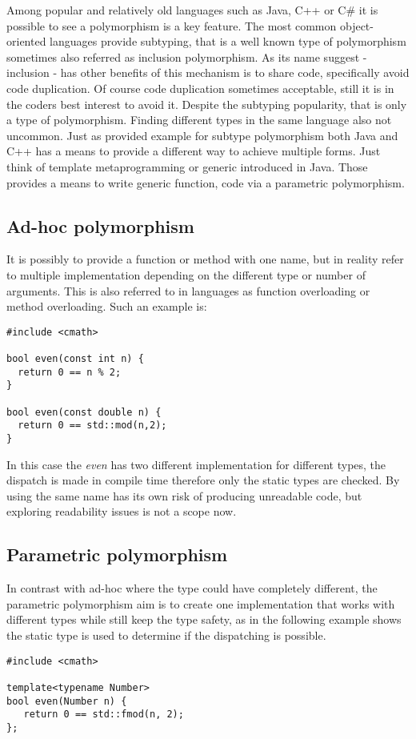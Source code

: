\documentclass[a4paper, 10pt, conference ]{llncs}
\begin{document}
Among popular and relatively old languages such as Java, C++ or C\# it is possible to see a polymorphism is a key feature. The most common object-oriented languages provide subtyping, that is a well known type of polymorphism sometimes also referred as inclusion polymorphism. As its name suggest - inclusion - has other benefits of this mechanism is to share code, specifically avoid code duplication. Of course code duplication sometimes acceptable, still it is in the coders best interest to avoid it. Despite the subtyping popularity, that is only a type of polymorphism. Finding different types in the same language also not uncommon. Just as provided example for subtype polymorphism both Java and C++ has a means to provide a different way to achieve multiple forms. Just think of template metaprogramming or generic introduced in Java. Those provides a means to write generic function, code via a parametric polymorphism.

\subsection{Ad-hoc polymorphism}

It is possibly to provide a function or method with one name, but in reality refer to multiple implementation depending on the different type or number of arguments. This is also referred to in languages as function overloading or method overloading. Such an example is:

\begin{verbatim}
#include <cmath>

bool even(const int n) {
  return 0 == n % 2;
}

bool even(const double n) {
  return 0 == std::mod(n,2);
}
\end{verbatim}

In this case the \emph{even} has two different implementation for different types, the dispatch is made in compile time therefore only the static types are checked. By using the same name has its own risk of producing unreadable code, but exploring readability issues is not a scope now.

\subsection{Parametric polymorphism}

In contrast with ad-hoc where the type could have completely different, the parametric polymorphism aim is to create one implementation that works with different types while still keep the type safety, as in the following example shows the static type is used to determine if the dispatching is possible.
\begin{verbatim}
#include <cmath>

template<typename Number>
bool even(Number n) {
   return 0 == std::fmod(n, 2);
};
\end{verbatim}
\end{document}
